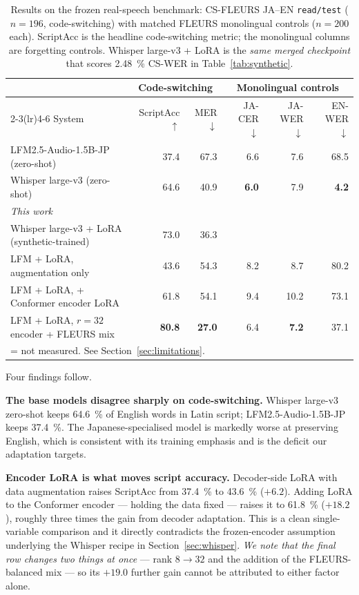 \documentclass[11pt,a4paper]{article}
\newcommand{\best}[1]{\textbf{#1}}
\newcommand{\na}{\textendash}
\begin{document}
\begin{table}[t]
\centering
\caption{Results on the frozen real-speech benchmark: CS-FLEURS JA--EN
\texttt{read/test} ($n=196$, code-switching) with matched FLEURS monolingual
controls ($n=200$ each). ScriptAcc is the headline code-switching metric; the
monolingual columns are forgetting controls. Whisper large-v3 + LoRA is the
\emph{same merged checkpoint} that scores \SI{2.48}{\percent} CS-WER in
Table~\ref{tab:synthetic}.}
\label{tab:real}
\small
\begin{tabular}{lrrrrr}
\toprule
& \multicolumn{2}{c}{Code-switching} & \multicolumn{3}{c}{Monolingual controls} \\
\cmidrule(lr){2-3}\cmidrule(lr){4-6}
System & ScriptAcc $\uparrow$ & MER $\downarrow$ & JA-CER $\downarrow$ & JA-WER $\downarrow$ & EN-WER $\downarrow$ \\
\midrule
LFM2.5-Audio-1.5B-JP (zero-shot)      & 37.4 & 67.3 & 6.6 & 7.6 & 68.5 \\
Whisper large-v3 (zero-shot)          & 64.6 & 40.9 & \best{6.0} & 7.9 & \best{4.2} \\
\midrule
\multicolumn{6}{l}{\emph{This work}} \\
Whisper large-v3 + LoRA (synthetic-trained) & 73.0 & 36.3 & \na & \na & \na \\
LFM + LoRA, augmentation only               & 43.6 & 54.3 & 8.2 & 8.7 & 80.2 \\
LFM + LoRA, {}+ Conformer encoder LoRA      & 61.8 & 54.1 & 9.4 & 10.2 & 73.1 \\
LFM + LoRA, $r{=}32$ encoder {}+ FLEURS mix & \best{80.8} & \best{27.0} & 6.4 & \best{7.2} & 37.1 \\
\bottomrule
\multicolumn{6}{l}{\footnotesize \na{} = not measured. See Section~\ref{sec:limitations}.} \\
\end{tabular}
\end{table}

Four findings follow.

\textbf{The base models disagree sharply on code-switching.} Whisper large-v3
zero-shot keeps \SI{64.6}{\percent} of English words in Latin script;
LFM2.5-Audio-1.5B-JP keeps \SI{37.4}{\percent}. The Japanese-specialised model is
markedly worse at preserving English, which is consistent with its training
emphasis and is the deficit our adaptation targets.

\textbf{Encoder LoRA is what moves script accuracy.} Decoder-side LoRA with data
augmentation raises ScriptAcc from \SI{37.4}{\percent} to \SI{43.6}{\percent}
($+6.2$). Adding LoRA to the Conformer encoder --- holding the data fixed ---
raises it to \SI{61.8}{\percent} ($+18.2$), roughly three times the gain from
decoder adaptation. This is a clean single-variable comparison and it directly
contradicts the frozen-encoder assumption underlying the Whisper recipe in
Section~\ref{sec:whisper}. \emph{We note that the final row changes two things at
once} --- rank $8 \rightarrow 32$ and the addition of the FLEURS-balanced mix ---
so its $+19.0$ further gain cannot be attributed to either factor alone.
\end{document}
